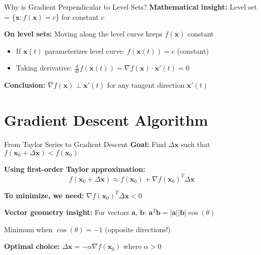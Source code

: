 \documentclass[aspectratio=169,11pt]{beamer}
\newcommand{\grad}{\nabla}
\newcommand{\vx}{\bm{x}}
\begin{document}
\begin{frame}{Why is Gradient Perpendicular to Level Sets?}
\textbf{Mathematical insight:} Level set = \{$\vx : f(\vx) = c$\} for constant $c$

\pause
\textbf{On level sets:} Moving along the level curve keeps $f(\vx)$ constant
\begin{itemize}
\item If $\vx(t)$ parameterizes level curve: $f(\vx(t)) = c$ (constant)
\item Taking derivative: $\frac{d}{dt}f(\vx(t)) = \grad f(\vx) \cdot \vx'(t) = 0$
\end{itemize}

\pause
\textbf{Conclusion:} $\grad f(\vx) \perp \vx'(t)$ for any tangent direction $\vx'(t)$

\pause
\begin{center}
\end{center}
\end{frame}

\section{Gradient Descent Algorithm}

\begin{frame}{From Taylor Series to Gradient Descent}
\textbf{Goal:} Find $\Delta\vx$ such that $f(\vx_0 + \Delta\vx) < f(\vx_0)$

\pause
\textbf{Using first-order Taylor approximation:}
\[f(\vx_0 + \Delta\vx) \approx f(\vx_0) + \grad f(\vx_0)^T \Delta\vx\]

\pause
\textbf{To minimize, we need:} $\grad f(\vx_0)^T \Delta\vx < 0$

\pause
\textbf{Vector geometry insight:} For vectors $\bm{a}$, $\bm{b}$: $\bm{a}^T\bm{b} = |\bm{a}||\bm{b}|\cos(\theta)$

Minimum when $\cos(\theta) = -1$ (opposite directions!)

\pause
\textbf{Optimal choice:} $\Delta\vx = -\alpha \grad f(\vx_0)$ where $\alpha > 0$

\pause
\begin{center}
\alert{\boxed{\vx_{\text{new}} = \vx_{\text{old}} - \alpha \grad f(\vx_{\text{old}})}}
\end{center}
\end{frame}
\end{document}
